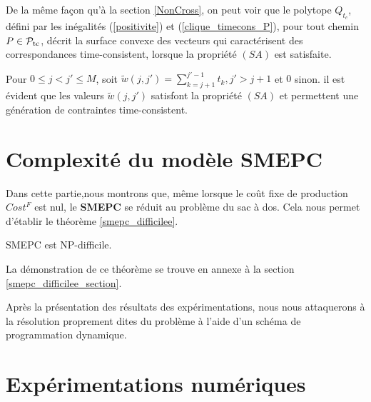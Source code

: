 {{De la même façon qu'à la section \ref{NonCross}, on peut voir que le polytope $Q_{t_c}$, défini par les inégalités (\ref{positivite}) et (\ref{clique_timecons_P}), pour tout chemin $P \in {\cal P}_\textrm{tc}$,
décrit la surface convexe des vecteurs qui caractérisent des correspondances time-consistent, lorsque la propriété $(SA)$ est satisfaite.

Pour $0\leq j<j'\leq M$, soit $\tilde{w}(j, j')=\sum_{k=j+1}^{j'-1} t_k, j'>j+1$ et $0$ sinon. 
il est évident que les valeurs $\tilde{w}(j,j')$ satisfont la propriété $(SA)$ et permettent une génération de contraintes time-consistent.


}
\section{Complexité du modèle SMEPC}
\label{NP-hard_SMEPC}
Dans cette partie,nous montrons que, même lorsque le coût fixe de production $Cost^F$ est nul, le \textbf{SMEPC} se réduit au problème du sac à dos. Cela nous permet d'établir le théorème \ref{smepc_difficilee}. 
\begin{theo}\label{smepc_difficilee}
SMEPC est NP-difficile.
\end{theo}
La démonstration de ce théorème se trouve en annexe à la section \ref{smepc_difficilee_section}.

 Après la présentation des résultats des expérimentations, nous nous attaquerons à la résolution proprement dites du problème à l'aide d'un schéma de programmation dynamique.  


\section{Expérimentations numériques}
\label{num_MIP}
}
